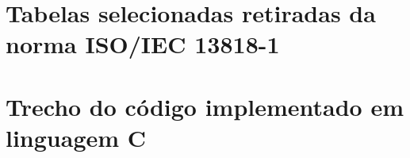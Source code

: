 \documentclass[
	12pt,				%
	openright,			%
	twoside,			%
	a4paper,			%
	english,			%
	french,				%
	brazil				%
	]{abntex2}
\begin{document}



\postextual



%
%


\begin{apendicesenv}

\partapendices

\chapter{Tabelas selecionadas retiradas da norma ISO/IEC 13818-1}


\chapter{Trecho do código implementado em linguagem C}

\end{apendicesenv}


\end{document}
